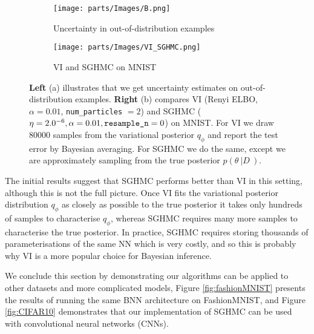 \begin{figure}
\centering
\begin{subfigure}{.5\textwidth}
  \centering
  \texttt{[image: parts/Images/B.png]}
  \caption{Uncertainty in out-of-distribution examples}
  \label{fig:B}
\end{subfigure}%
\begin{subfigure}{.5\textwidth}
  \centering
  \texttt{[image: parts/Images/VI\_SGHMC.png]}
  \caption{VI and SGHMC on MNIST}
  \label{fig:VI}
\end{subfigure}
\caption{{\bf Left} (a) illustrates that we get uncertainty estimates on out-of-distribution examples. {\bf Right} (b) compares VI (Renyi ELBO, $\alpha = 0.01$, \texttt{num\_particles} $= 2$) and SGHMC ($\eta = 2.0\time10^{-6}, \alpha=0.01, \texttt{resample\_n} =0$) on MNIST. For VI we draw 80000 samples from the variational posterior $q_{\phi}$ and report the test error by Bayesian averaging. For SGHMC we do the same, except we are approximately sampling from the true posterior $p(\theta \: | D \:)$.}
\label{fig:demo}
\end{figure}

The initial results suggest that SGHMC performs better than VI in this setting, although this is not the full picture. Once VI fits the variational posterior distribution $q_{\phi}$ as closely as possible to the true posterior it takes only hundreds of samples to characterise $q_{\phi}$, whereas SGHMC requires many more samples to characterise the true posterior. In practice, SGHMC requires storing thousands of parameterisations of the same NN which is very costly, and so this is probably why VI is a more popular choice for Bayesian inference. 

We conclude this section by demonstrating our algorithms can be applied to other datasets and more complicated models, Figure \ref{fig:fashionMNIST} presents the results of running the same BNN architecture on FashionMNIST, and Figure \ref{fig:CIFAR10} demonstrates that our implementation of SGHMC can be used with convolutional neural networks (CNNs).

